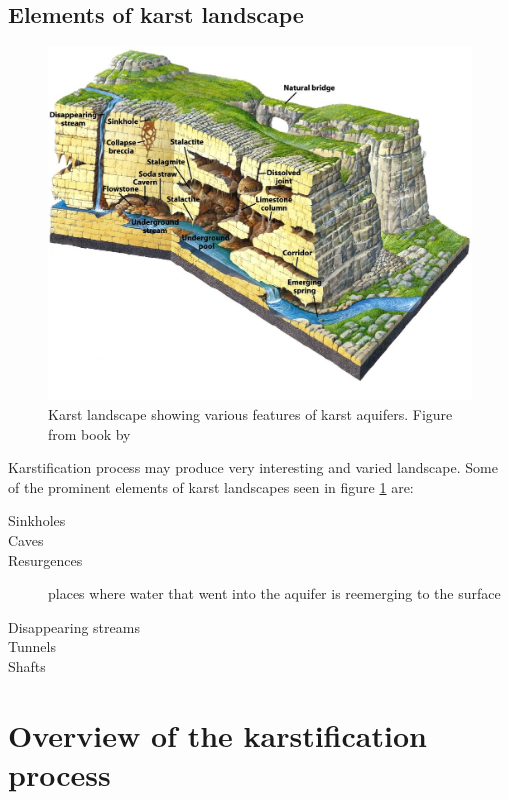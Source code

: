 \subsection{Elements of karst landscape}

\begin{figure}
  \centerline{\includegraphics[width=1.2\textwidth]{chapters/karstification/karst_landscape.jpg}}
  \caption{Karst landscape showing various features of karst aquifers.
    Figure from book by \cite{marshak2006}}
  \label{fig:karstlandscape}
\end{figure}


Karstification process may produce very interesting and varied landscape. Some
of the prominent elements of karst landscapes seen in figure \ref{fig:karstlandscape}
are:

\begin{description}
  \item[Sinkholes]
  \item[Caves]
  \item[Resurgences]
    places where water that went into the aquifer is reemerging to the surface
  \item[Disappearing streams]
  \item[Tunnels]
  \item[Shafts]
\end{description}

\section{Overview of the karstification process}

